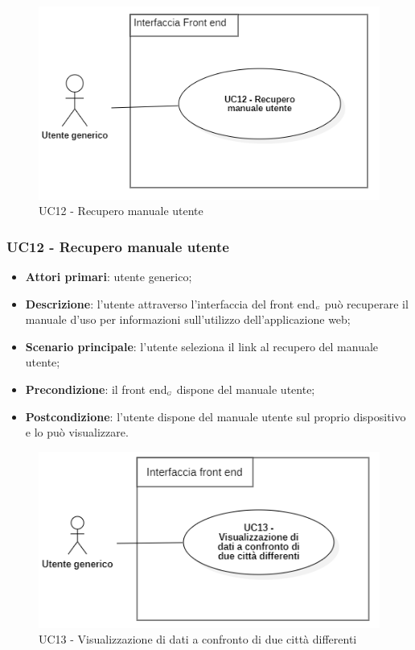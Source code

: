 \begin{center}
	\begin{figure}[H]
		\centering\includegraphics[scale=0.7]{../immagini/attori_casi/uc12.png}
		\caption{UC12 - Recupero manuale utente}
	\end{figure}
\end{center}


\subsubsection{UC12 - Recupero manuale utente}\label{CasiDUsoCasiDUsoFacoltativiTraUnUtenteEIlFrontEndElencoCasiDUsoUC12RecuperoManualeUtente}


\begin{itemize}
	\item \textbf{Attori primari}: utente generico;
	\item \textbf{Descrizione}: l'utente attraverso l'interfaccia del front end$_{\scaleto{G}{3pt}}$ può recuperare il manuale d'uso per informazioni sull'utilizzo dell'applicazione web;
	\item \textbf{Scenario principale}: l'utente seleziona il link al recupero del manuale utente;
	\item \textbf{Precondizione}: il front end$_{\scaleto{G}{3pt}}$ dispone del manuale utente;
	\item \textbf{Postcondizione}: l'utente dispone del manuale utente sul proprio dispositivo e lo può visualizzare.
\end{itemize}


\begin{center}
	\begin{figure}[H]
		\centering\includegraphics[scale=0.7]{../immagini/attori_casi/uc13.png}
		\caption{UC13 - Visualizzazione di dati a confronto di due città differenti}
	\end{figure}
\end{center}


